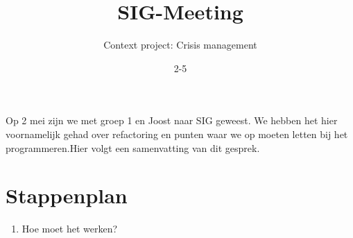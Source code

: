 \documentclass{article}
\begin{document}
\title{SIG-Meeting}
\author{Context project: Crisis management}
\date{2-5} 
\maketitle

Op 2 mei zijn we met groep 1 en Joost naar SIG geweest. We hebben het hier voornamelijk gehad over refactoring en punten waar we op moeten letten bij het programmeren.Hier volgt een samenvatting van dit gesprek. 

\section{Stappenplan}
\begin{enumerate}
\item Hoe moet het werken?  


\end{enumerate}
\end{document}
